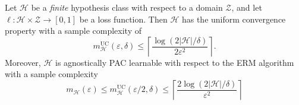 \begin{proposition}
    \label{prop:finite-hypothesis-agnostically-pac-learnable}
    Let \(\mathcal{H}\) be a \emph{finite} hypothesis class with respect to a domain
    \(\mathcal{Z}\), and let \(\ell: \mathcal{H} \times \mathcal{Z} \to [0, 1]\) be
    a loss function. Then \(\mathcal{H}\) has the uniform convergence property with
    a sample complexity of
    \[
        m_{\mathcal{H}}^{\text{UC}}(\varepsilon, \delta) \leq
        \left\lceil \frac{\log(2 |\mathcal{H}| / \delta)}{2 \varepsilon^2} \right\rceil.
    \]
    Moreover, \(\mathcal{H}\) is agnostically PAC learnable with respect to the ERM
    algorithm with a sample complexity
    \[
        m_{\mathcal{H}}(\varepsilon) \leq m_{\mathcal{H}}^{\text{UC}}(\varepsilon/2, \delta)
        \leq
        \left\lceil \frac{2 \log(2 |\mathcal{H}| / \delta)}{\varepsilon^2} \right\rceil
    \]
\end{proposition}


